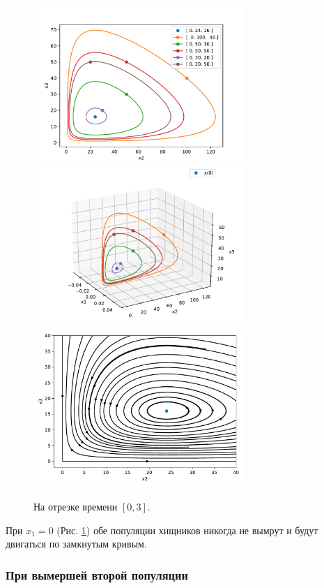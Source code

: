     \begin{figure}[H]
        \centering
        \includegraphics[width=8cm]{pictures/x1_0phase.pdf}
        \includegraphics[width=8cm]{pictures/x1_0phase3.pdf}
        \includegraphics[width=8cm]{pictures/x1_0vector.pdf}
        \caption{На отрезке времени \( [0, 3] \).}\label{lvx1_0}
    \end{figure}
    При \(x_1 = 0\) (Рис. \ref{lvx1_0}) обе популяции хищников никогда не вымрут и будут двигаться по замкнутым кривым.


    \subsubsection{При вымершей второй популяции}

